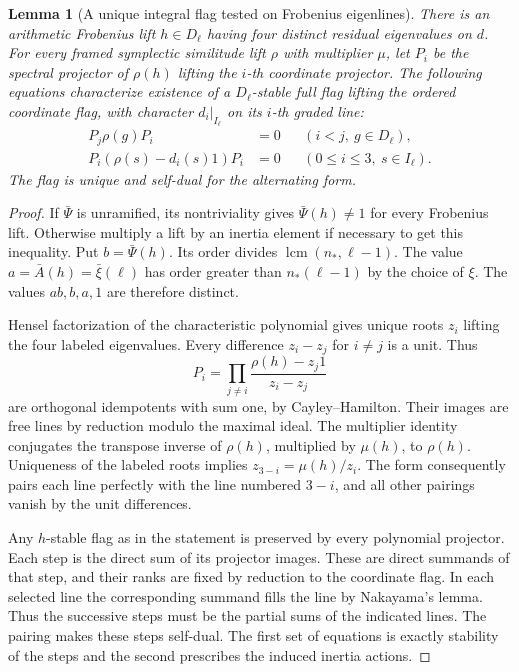 \documentclass[a4paper,11pt]{article}
\newtheorem{lemma}[proposition]{Lemma}
\theoremstyle{definition}
\theoremstyle{remark}
\numberwithin{equation}{section}
\begin{document}
\begin{lemma}[A unique integral flag tested on Frobenius eigenlines]\leavevmode
\label{lem:sympflag468}
There is an arithmetic Frobenius lift \(h\in D_\ell\) having four
distinct residual eigenvalues on \(d\). For every framed symplectic
similitude lift \(\rho\) with multiplier \(\mu\), let \(P_i\) be the
spectral projector of \(\rho(h)\) lifting the \(i\)-th coordinate
projector. The following equations characterize existence of a
\(D_\ell\)-stable full flag lifting the ordered coordinate flag,
with character \(d_i|_{I_\ell}\) on its \(i\)-th graded line:
\[
 \begin{aligned}
 P_j\rho(g)P_i&=0 &&(i<j,\ g\in D_\ell),\\
 P_i(\rho(s)-d_i(s)1)P_i&=0 &&(0\le i\le3,\ s\in I_\ell).
 \end{aligned}
\]
The flag is unique and self-dual for the alternating form.
\end{lemma}
\begin{proof}
If \(\bar\Psi\) is unramified, its nontriviality gives
\(\bar\Psi(h)\ne1\) for every Frobenius lift. Otherwise multiply
a lift by an inertia element if necessary to get this inequality.
Put \(b=\bar\Psi(h)\). Its order divides
\(\operatorname{lcm}(n_*,\ell-1)\). The value \(a=\bar A(h)=\bar\xi(\ell)\)
has order greater than \(n_*(\ell-1)\) by the choice of \(\xi\).
The values \(ab,b,a,1\) are therefore distinct.

Hensel factorization of the characteristic polynomial gives unique
roots \(z_i\) lifting the four labeled eigenvalues. Every difference
\(z_i-z_j\) for \(i\ne j\) is a unit. Thus
\[
          P_i=\prod_{j\ne i}\frac{\rho(h)-z_j1}{z_i-z_j}
\]
are orthogonal idempotents with sum one, by Cayley--Hamilton. Their
images are free lines by reduction modulo the maximal ideal. The
multiplier identity conjugates the transpose inverse of \(\rho(h)\),
multiplied by \(\mu(h)\), to \(\rho(h)\). Uniqueness of the labeled
roots implies \(z_{3-i}=\mu(h)/z_i\). The form consequently pairs
each line perfectly with the line numbered \(3-i\), and all other
pairings vanish by the unit differences.

Any \(h\)-stable flag as in the statement is preserved by every
polynomial projector. Each step is the direct sum of its projector
images. These are direct summands of that step, and their ranks are
fixed by reduction to the coordinate flag. In each selected line
the corresponding summand fills the line by Nakayama's lemma.
Thus the successive steps must be the partial sums of the indicated
lines. The pairing makes these steps self-dual. The first set of
equations is exactly stability of the steps and the second prescribes
the induced inertia actions.
\end{proof}
\end{document}
